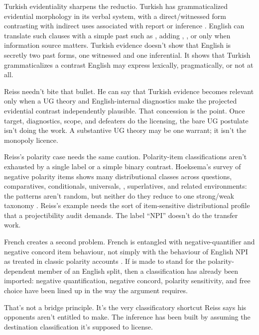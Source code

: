 \documentclass[12pt]{article}
\begin{document}
Turkish evidentiality sharpens the reductio. Turkish has grammaticalized evidential morphology in its verbal system, with a direct/witnessed form contrasting with indirect uses associated with report or inference \citep{sener2011turkishEvidentials}. English can translate such clauses with a simple past such as , adding , , or  only when information source matters. Turkish evidence doesn't show that English  is secretly two past forms, one witnessed and one inferential. It shows that Turkish grammaticalizes a contrast English may express lexically, pragmatically, or not at all.

Reiss needn't bite that bullet. He can say that Turkish evidence becomes relevant only when a UG theory and English-internal diagnostics make the projected evidential contrast independently plausible. That concession is the point. Once target, diagnostics, scope, and defeaters do the licensing, the bare UG postulate isn't doing the work. A substantive UG theory may be one warrant; it isn't the monopoly licence.

Reiss's polarity case needs the same caution. Polarity-item classifications aren't exhausted by a single label or a simple binary contrast. Hoeksema's survey of negative polarity items shows many distributional classes across questions, comparatives, conditionals, universals, , superlatives, and related environments: the patterns aren't random, but neither do they reduce to one strong/weak taxonomy \citep{hoeksema2012}. Reiss's example needs the sort of item-sensitive distributional profile that a projectibility audit demands. The label \enquote{NPI} doesn't do the transfer work.

French creates a second problem. French  is entangled with negative-quantifier and negative concord item behaviour, not simply with the behaviour of English NPI  as treated in classic polarity accounts \citep{ladusaw1979,chierchia_logic_2013}. If  is made to stand for the polarity-dependent member of an English split, then a classification has already been imported: negative quantification, negative concord, polarity sensitivity, and free choice have been lined up in the way the argument requires.

That's not a bridge principle. It's the very classificatory shortcut Reiss says his opponents aren't entitled to make. The inference has been built by assuming the destination classification it's supposed to license.
\end{document}
